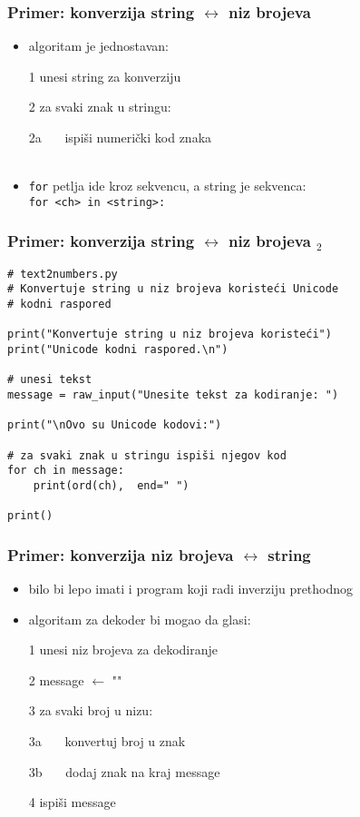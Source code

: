 \documentclass[utf8,compress]{beamer}
\begin{document}
\begin{frame}[fragile]
  \frametitle{Primer: konverzija string $\leftrightarrow$ niz brojeva}
  \begin{itemize}
    \item algoritam je jednostavan:
    \item[1] unesi string za konverziju
    \item[2] za svaki znak u stringu:
    \item[2a] \ \ \ ispiši numerički kod znaka \\ \ \\ %
    \item \texttt{for} petlja ide kroz sekvencu, a string je sekvenca: \\
      \texttt{for <ch> in <string>:}
  \end{itemize}
\end{frame}

\begin{frame}[fragile,shrink=10]
  \frametitle{Primer: konverzija string $\leftrightarrow$ niz brojeva $_2$}
\begin{verbatim}
# text2numbers.py
# Konvertuje string u niz brojeva koristeći Unicode
# kodni raspored

print("Konvertuje string u niz brojeva koristeći")
print("Unicode kodni raspored.\n")

# unesi tekst
message = raw_input("Unesite tekst za kodiranje: ")

print("\nOvo su Unicode kodovi:")

# za svaki znak u stringu ispiši njegov kod
for ch in message:
    print(ord(ch),  end=" ")

print()
\end{verbatim}
\end{frame}

\begin{frame}[fragile]
  \frametitle{Primer: konverzija niz brojeva $\leftrightarrow$ string}
  \begin{itemize}
    \item bilo bi lepo imati i program koji radi inverziju prethodnog
    \item algoritam za dekoder bi mogao da glasi:
    \item[1] unesi niz brojeva za dekodiranje
    \item[2] message $\leftarrow$ ""
    \item[3] za svaki broj u nizu:
    \item[3a] \ \ \ konvertuj broj u znak
    \item[3b] \ \ \ dodaj znak na kraj message
    \item[4] ispiši message
  \end{itemize}
\end{frame}
\end{document}
